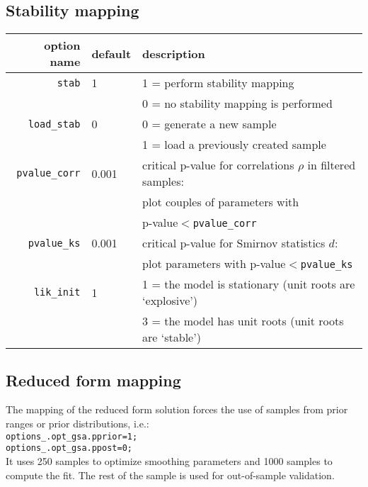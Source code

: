 \documentclass[12pt,a4paper]{article}
\begin{document}
\subsection{Stability mapping}
\begin{tabular}{r|l|l}
                option name & default & description  \\ \hline
                 \verb"stab"& 1& 1 = perform stability mapping \\
                            &  & 0 = no stability mapping is performed\\
            \verb"load_stab"& 0& 0 =  generate a new sample\\
                            &  & 1 = load a previously created sample \\
          \verb"pvalue_corr"& 0.001& critical p-value for correlations $\rho$ in filtered samples:\\
                            &    & plot couples of parameters with \\
                            &   & p-value$<$\verb"pvalue_corr"\\
          \verb"pvalue_ks"  & 0.001& critical p-value for Smirnov statistics $d$: \\
                            &   & plot parameters with p-value$<$\verb"pvalue_ks"\\
          \verb"lik_init"  & 1& 1 = the model is stationary (unit roots are `explosive')\\
                            &   & 3 = the model has unit roots (unit roots are `stable')\\ \hline
\end{tabular}

\newpage
\subsection{Reduced form mapping}%
The mapping of the reduced form solution forces the use of samples
from prior ranges or prior distributions, i.e.:
\\
\verb"options_.opt_gsa.pprior=1;"\\
\verb"options_.opt_gsa.ppost=0;"\\

It uses 250 samples to optimize smoothing parameters and 1000
samples to compute the fit. The rest of the sample is used  for
out-of-sample validation. \vspace{0.5cm}
\end{document}
